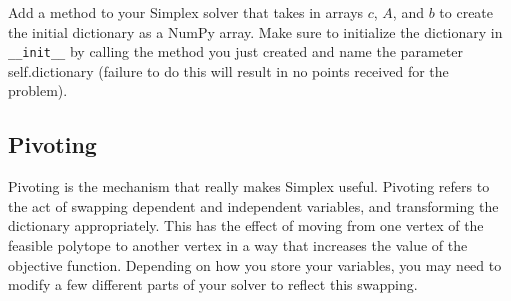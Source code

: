 \begin{comment}
We can also use a dictionary of the format:
\begin{equation}
T = \begin{bmatrix}
    0 & \c\trp  & 0 \\
    \0 & I_n & \0\\
    \b & -A  & \0
\end{bmatrix}.
\label{eqn:matrix_tab}
\end{equation}
Here, $T$ is a square matrix of size $(n+m+1) \times (n+m+1)$.
The advantage of this form of the dictionary is that all the pivot bookkeeping is built into the matrix.
For our example problem, the initial dictionary of this form is
\begin{equation}
T = \begin{bmatrix}
        0 & 3 & 2 & 0 & 0 & 0 \\
        0 & 1 & 0 & 0 & 0 & 0 \\
        0 & 0 & 1 & 0 & 0 & 0 \\
        2 &-1 & 1 & 0 & 0 & 0 \\
        5 &-3 &-1 & 0 & 0 & 0 \\
        7 &-4 &-3 & 0 & 0 & 0
\end{bmatrix}.
\label{eqn:matrix_inittab}
\end{equation}
\end{comment}

\begin{problem} %
Add a method to your Simplex solver that takes in arrays $c$, $A$, and $b$ to create the initial dictionary as a NumPy array. Make sure to initialize the dictionary in \texttt{\_\_init\_\_} by calling the method you just created and name the parameter self.dictionary (failure to do this will result in no points received for the problem).
\label{prob:makedictionary}
\end{problem}

\subsection*{Pivoting} %

Pivoting is the mechanism that really makes Simplex useful.
Pivoting refers to the act of swapping dependent and independent variables, and transforming the dictionary appropriately.
This has the effect of moving from one vertex of the feasible polytope to another vertex in a way that increases the value of the objective function.
Depending on how you store your variables, you may need to modify a few different parts of your solver to reflect this swapping.

